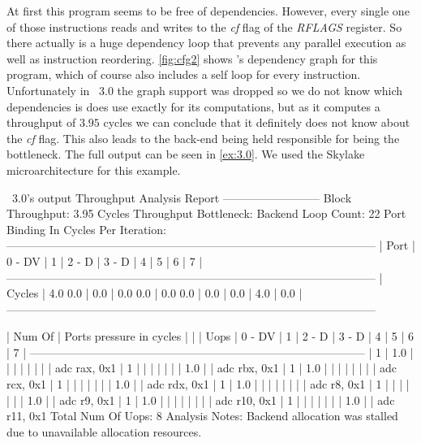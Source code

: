\FloatBarrier

At first this program seems to be free of dependencies. However, every single one of those instructions reads and writes to the \emph{cf} flag of the \emph{RFLAGS} register. So there actually is a huge dependency loop that prevents any parallel execution as well as instruction reordering. \autoref{fig:cfg2} shows \suaca's dependency graph for this program, which of course also includes a self loop for every instruction.\\
Unfortunately in \iaca\ $3.0$ the graph support was dropped so we do not know which dependencies is does use exactly for its computations, but as it computes a throughput of $3.95$ cycles we can conclude that it definitely does not know about the \emph{cf} flag. This also leads to the back-end being held responsible for being the bottleneck. The full output can be seen in \autoref{ex:3.0}. We used the Skylake microarchitecture for this example. 

\begin{LabeledExample}{\iaca\ $3.0$'s output}{\label{ex:3.0}}
    Throughput Analysis Report
    --------------------------
    Block Throughput: 3.95 Cycles       Throughput Bottleneck: Backend
    Loop Count:  22
    Port Binding In Cycles Per Iteration:
    --------------------------------------------------------------------------------------------------
    |  Port  |   0   -  DV   |   1   |   2   -  D    |   3   -  D    |   4   |   5   |   6   |   7   |
    --------------------------------------------------------------------------------------------------
    | Cycles |  4.0     0.0  |  0.0  |  0.0     0.0  |  0.0     0.0  |  0.0  |  0.0  |  4.0  |  0.0  |
    --------------------------------------------------------------------------------------------------
    
    
    | Num Of   |                    Ports pressure in cycles                         |      |
    |  Uops    |  0  - DV    |  1   |  2  -  D    |  3  -  D    |  4   |  5   |  6   |  7   |
    -----------------------------------------------------------------------------------------
    |   1      | 1.0         |      |             |             |      |      |      |      | adc rax, 0x1
    |   1      |             |      |             |             |      |      | 1.0  |      | adc rbx, 0x1
    |   1      | 1.0         |      |             |             |      |      |      |      | adc rcx, 0x1
    |   1      |             |      |             |             |      |      | 1.0  |      | adc rdx, 0x1
    |   1      | 1.0         |      |             |             |      |      |      |      | adc r8, 0x1
    |   1      |             |      |             |             |      |      | 1.0  |      | adc r9, 0x1
    |   1      | 1.0         |      |             |             |      |      |      |      | adc r10, 0x1
    |   1      |             |      |             |             |      |      | 1.0  |      | adc r11, 0x1
    Total Num Of Uops: 8
    Analysis Notes:
    Backend allocation was stalled due to unavailable allocation resources.
\end{LabeledExample}

